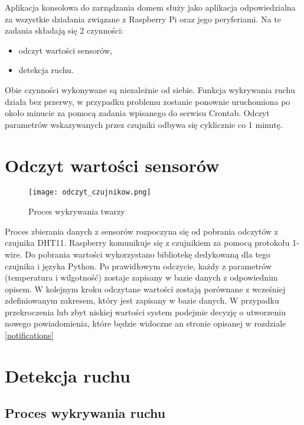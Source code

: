 Aplikacja konsolowa do zarządzania domem służy jako aplikacja odpowiedzialna za wszystkie działania związane z Raspberry Pi oraz jego peryferiami. Na te zadania składają się 2 czynności:
\begin{itemize}
\item odczyt wartości sensorów,
\item detekcja ruchu.
\end{itemize}
Obie czynności wykonywane są niezależnie od siebie. Funkcja wykrywania ruchu działa bez przerwy, w przypadku problemu zostanie ponownie uruchomiona po około minucie za pomocą zadania wpisanego do serwisu Crontab. Odczyt parametrów wskazywanych przez czujniki odbywa się cyklicznie co 1 minutę.

\section{Odczyt wartości sensorów}
\begin{figure}[H]
	\centering
	\texttt{[image: odczyt\_czujnikow.png]}
	\caption{Proces wykrywania twarzy}
	\label{fig:wykrywanie_proces}
\end{figure}
Proces zbierania danych z sensorów rozpoczyna się od pobrania odczytów z czujnika DHT11. Raspberry komunikuje się z czujnikiem za pomocą protokołu 1-wire. Do pobrania wartości wykorzystano bibliotekę dedykowaną dla tego czujnika i języka Python. Po prawidłowym odczycie, każdy z parametrów (temperatura i wilgotność) zostaje zapisany w bazie danych z odpowiednim opisem. W kolejnym kroku odczytane wartości zostają porównane z wcześniej zdefiniowanym zakresem, który jest zapisany w bazie danych. W przypadku przekroczenia lub zbyt niskiej wartości system podejmie decyzję o utworzeniu nowego powiadomienia, które będzie widoczne an stronie opisanej w rozdziale \ref{notifications}
\section{Detekcja ruchu}

\subsection{Proces wykrywania ruchu}